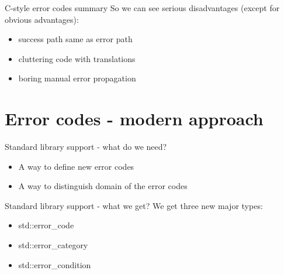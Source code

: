 \documentclass[10pt]{beamer}
\begin{document}
\begin{frame}{C-style error codes summary}
	So we can see {\color{red}serious disadvantages} (except for {\color{blue}obvious advantages}):
	
	\begin{itemize}[<+- | alert@+>]
		\item success path same as error path
		\item cluttering code with translations
		\item boring manual error propagation
	\end{itemize}
\end{frame}
	

\section{Error codes - modern approach}
\begin{frame}{Standard library support - what do we need?}
	\begin{itemize}
		\item A way to define new error codes
		\item A way to distinguish domain of the error codes
	\end{itemize}
\end{frame}

\begin{frame}{Standard library support - what we get?}
	We get three new major types:
	\begin{itemize}[<+- | alert@+>]
		\item std::error\_code
		\item std::error\_category
		\item std::error\_condition
	\end{itemize}
\end{frame}
\end{document}
